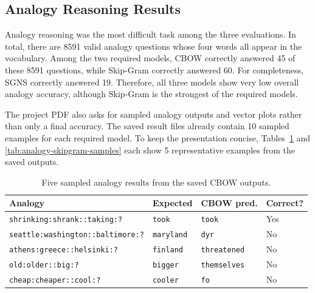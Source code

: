 \documentclass[11pt,a4paper]{article}
\begin{document}
\subsection{Analogy Reasoning Results}
Analogy reasoning was the most difficult task among the three evaluations. In total, there are 8591 valid analogy questions whose four words all appear in the vocabulary. Among the two required models, CBOW correctly answered 45 of these 8591 questions, while Skip-Gram correctly answered 60. For completeness, SGNS correctly answered 19. Therefore, all three models show very low overall analogy accuracy, although Skip-Gram is the strongest of the required models.

The project PDF also asks for sampled analogy outputs and vector plots rather than only a final accuracy. The saved result files already contain 10 sampled examples for each required model. To keep the presentation concise, Tables~\ref{tab:analogy-cbow-samples} and \ref{tab:analogy-skipgram-samples} each show 5 representative examples from the saved outputs.

\begin{table}[H]
    \centering
    \caption{Five sampled analogy results from the saved CBOW outputs.}
    \label{tab:analogy-cbow-samples}
    \begin{tabular}{p{}p{}p{}p{}}
        \toprule
        Analogy & Expected & CBOW pred. & Correct? \\
        \midrule
        \texttt{shrinking:shrank::taking:?} & \texttt{took} & \texttt{took} & Yes \\
        \texttt{seattle:washington::baltimore:?} & \texttt{maryland} & \texttt{dyr} & No \\
        \texttt{athens:greece::helsinki:?} & \texttt{finland} & \texttt{threatened} & No \\
        \texttt{old:older::big:?} & \texttt{bigger} & \texttt{themselves} & No \\
        \texttt{cheap:cheaper::cool:?} & \texttt{cooler} & \texttt{fo} & No \\
        \bottomrule
    \end{tabular}
\end{table}
\end{document}
